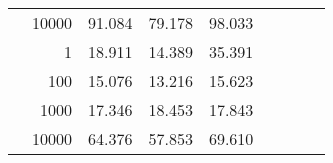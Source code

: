 \begin{table}
\begin{tabular}{rrrrrrrrr}
	            
					 &  
					 
					\multirow{ 1 }{*}{ 10000 } &
					
						
							    
							    
	                           91.084 & 79.178 & 98.033  \\
	                
	            
	        
				\noalign{\smallskip}\hline
				\multirow{ 4 }{*}{ 2000000 } &
				
					
					 
					\multirow{ 1 }{*}{ 1 } &
					
						
							    
							    
	                           18.911 & 14.389 & 35.391  \\
	                
	            
					 &  
					 
					\multirow{ 1 }{*}{ 100 } &
					
						
							    
							    
	                           15.076 & 13.216 & 15.623  \\
	                
	            
					 &  
					 
					\multirow{ 1 }{*}{ 1000 } &
					
						
							    
							    
	                           17.346 & 18.453 & 17.843  \\
	                
	            
					 &  
					 
					\multirow{ 1 }{*}{ 10000 } &
					
						
							    
							    
	                           64.376 & 57.853 & 69.610  \\
	                
	            
	        

\hline

\end{tabular}
\end{table}
\clearpage


	    

